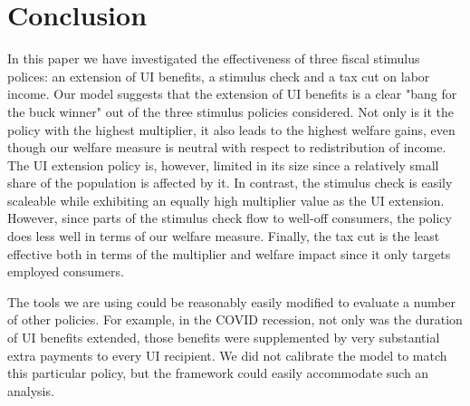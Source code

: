 \documentclass[../HAFiscal]{subfiles}
\begin{document}
	
\section{Conclusion}

In this paper we have investigated the effectiveness of three fiscal stimulus polices: an extension of UI benefits, a stimulus check and a tax cut on labor income. Our model suggests that the extension of UI benefits is a clear "bang for the buck winner" out of the three stimulus policies considered. Not only is it the policy with the highest multiplier, it also leads to the highest welfare gains, even though our welfare measure is neutral with respect to redistribution of income. The UI extension policy is, however, limited in its size since a relatively small share of the population is affected by it. In contrast, the stimulus check is easily scaleable while exhibiting an equally high multiplier value as the UI extension. However, since parts of the stimulus check flow to well-off consumers, the policy does less well in terms of our welfare measure. Finally, the tax cut is the least effective both in terms of the multiplier and welfare impact since it only targets employed consumers.

The tools we are using could be reasonably easily modified to evaluate a number of other policies.  For example, in the COVID recession, not only was the duration of UI benefits extended, those benefits were supplemented by very substantial extra payments to every UI recipient.  We did not calibrate the model to match this particular policy, but the framework could easily accommodate such an analysis.
\end{document}
